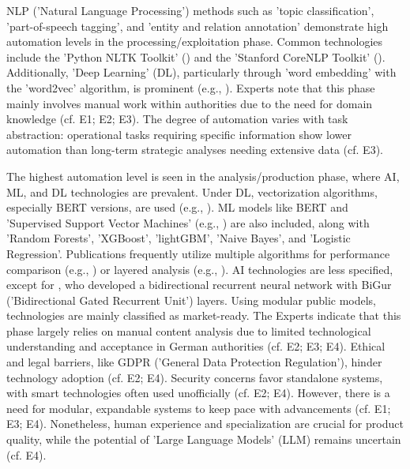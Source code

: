 \documentclass[10pt]{article}
\begin{document}
NLP ('Natural Language Processing') methods such as 'topic classification', 'part-of-speech tagging', and 'entity and relation annotation' demonstrate high automation levels in the processing/exploitation phase. Common technologies include the 'Python NLTK Toolkit' (\cite{Hubbard.2022}) and the 'Stanford CoreNLP Toolkit' (\cite{Middleton.2020}). Additionally, 'Deep Learning' (DL), particularly through 'word embedding' with the 'word2vec' algorithm, is prominent (e.g., \cite{Bai.2020}). Experts note that this phase mainly involves manual work within authorities due to the need for domain knowledge (cf. E1; E2; E3). The degree of automation varies with task abstraction: operational tasks requiring specific information show lower automation than long-term strategic analyses needing extensive data (cf. E3).

The highest automation level is seen in the analysis/production phase, where AI, ML, and DL technologies are prevalent. Under DL, vectorization algorithms, especially BERT versions, are used (e.g., \cite{Ma.2022}). ML models like BERT and 'Supervised Support Vector Machines' (e.g., \cite{Iorga.2020}) are also included, along with 'Random Forests', 'XGBoost', 'lightGBM', 'Naive Bayes', and 'Logistic Regression'. Publications frequently utilize multiple algorithms for performance comparison (e.g., \cite{Tao.2023}) or layered analysis (e.g., \cite{Yang.2022}). AI technologies are less specified, except for \textcite{Dale.2023}, who developed a bidirectional recurrent neural network with BiGur ('Bidirectional Gated Recurrent Unit') layers. Using modular public models, technologies are mainly classified as market-ready. The Experts indicate that this phase largely relies on manual content analysis due to limited technological understanding and acceptance in German authorities (cf. E2; E3; E4). Ethical and legal barriers, like GDPR ('General Data Protection Regulation'), hinder technology adoption (cf. E2; E4). Security concerns favor standalone systems, with smart technologies often used unofficially (cf. E2; E4). However, there is a need for modular, expandable systems to keep pace with advancements (cf. E1; E3; E4). Nonetheless, human experience and specialization are crucial for product quality, while the potential of 'Large Language Models' (LLM) remains uncertain (cf. E4).
\end{document}

